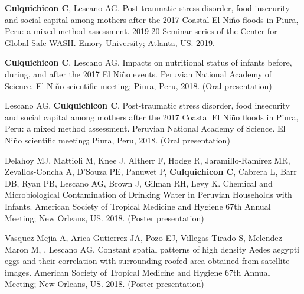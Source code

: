 \documentclass[10pt]{article}
\begin{document}
	\begin{etaremune}
	\item {\bf Culquichicon C}, Lescano AG. Post-traumatic stress disorder, food insecurity and social capital among mothers after the 2017 Coastal El Niño floods in Piura, Peru: a mixed method assessment. 2019-20 Seminar series of the Center for Global Safe WASH. Emory University; Atlanta, US. 2019. \\
	\vspace{-0.23in}
	
	\item {\bf Culquichicon C}, Lescano AG. Impacts on nutritional status of infants before, during, and after the 2017 El Niño events. Peruvian National Academy of Science. El Niño scientific meeting; Piura, Peru, 2018. (Oral presentation) \\
	\vspace{-0.23in}

	\item Lescano AG, {\bf Culquichicon C}. Post-traumatic stress disorder, food insecurity and social capital among mothers after the 2017 Coastal El Niño floods in Piura, Peru: a mixed method assessment. Peruvian National Academy of Science. El Niño scientific meeting; Piura, Peru, 2018. (Oral presentation) \\
	\vspace{-0.23in}

	\item Delahoy MJ, Mattioli M, Knee J, Altherr F, Hodge R, Jaramillo-Ramírez MR, Zevallos-Concha A, D’Souza PE, Panuwet P, {\bf Culquichicon C}, Cabrera L, Barr DB, Ryan PB, Lescano AG, Brown J, Gilman RH, Levy K. Chemical and Microbiological Contamination of Drinking Water in Peruvian Households with Infants. American Society of Tropical Medicine and Hygiene 67th Annual Meeting; New Orleans, US. 2018. (Poster presentation) \\
	\vspace{-0.23in}

	\item Vasquez-Mejia A, Arica-Gutierrez JA, Pozo EJ, Villegas-Tirado S, Melendez-Maron M, , Lescano AG. Constant spatial patterns of high density Aedes aegypti eggs and their correlation with surrounding roofed area obtained from satellite images. American Society of Tropical Medicine and Hygiene 67th Annual Meeting; New Orleans, US. 2018. (Poster presentation) \\
	\vspace{-0.23in}


\end{etaremune}
\end{document}
